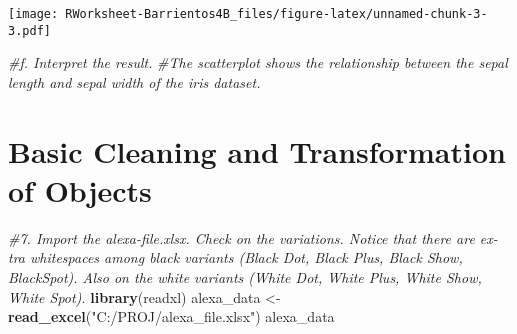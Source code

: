 \documentclass[
]{article}
\newenvironment{Shaded}{\begin{snugshade}}{\end{snugshade}}
\newcommand{\AttributeTok}[1]{\textcolor[rgb]{0.13,0.29,0.53}{#1}}
\newcommand{\CommentTok}[1]{\textcolor[rgb]{0.56,0.35,0.01}{\textit{#1}}}
\newcommand{\DecValTok}[1]{\textcolor[rgb]{0.00,0.00,0.81}{#1}}
\newcommand{\FunctionTok}[1]{\textcolor[rgb]{0.13,0.29,0.53}{\textbf{#1}}}
\newcommand{\NormalTok}[1]{#1}
\newcommand{\OtherTok}[1]{\textcolor[rgb]{0.56,0.35,0.01}{#1}}
\newcommand{\SpecialCharTok}[1]{\textcolor[rgb]{0.81,0.36,0.00}{\textbf{#1}}}
\newcommand{\StringTok}[1]{\textcolor[rgb]{0.31,0.60,0.02}{#1}}
\begin{document}
\begin{Shaded}
\end{Shaded}

\texttt{[image: RWorksheet-Barrientos4B\_files/figure-latex/unnamed-chunk-3-3.pdf]}

\begin{Shaded}
\begin{Highlighting}[]
\CommentTok{\#f. Interpret the result.}
\CommentTok{\#The scatterplot shows the relationship between the sepal length and sepal width of the iris dataset. }
\end{Highlighting}
\end{Shaded}

\section{Basic Cleaning and Transformation of
Objects}\label{basic-cleaning-and-transformation-of-objects}

\begin{Shaded}
\begin{Highlighting}[]
\CommentTok{\#7. Import the alexa{-}file.xlsx. Check on the variations. Notice that there are ex{-}tra whitespaces among black variants (Black Dot, Black Plus, Black Show, BlackSpot). Also on the white variants (White Dot, White Plus, White Show, White Spot).}
\FunctionTok{library}\NormalTok{(readxl)}
\NormalTok{alexa\_data }\OtherTok{\textless{}{-}} \FunctionTok{read\_excel}\NormalTok{(}\StringTok{"C:/PROJ/alexa\_file.xlsx"}\NormalTok{)}
\NormalTok{alexa\_data}
\end{Highlighting}
\end{Shaded}
\end{document}

